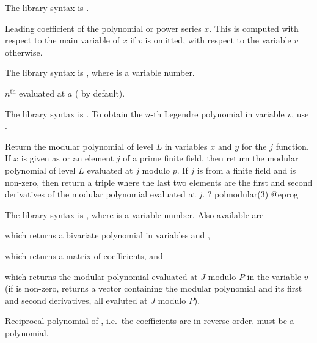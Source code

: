 The library syntax is .

\label{se:pollead}
Leading coefficient of the polynomial or power series $x$. This is
 computed with respect to the main variable of $x$ if $v$ is omitted, with
 respect to the variable $v$ otherwise.

The library syntax is , where  is a variable number.

\label{se:pollegendre}
$n^{\text{th}}$  evaluated at $a$ ( by
default).

The library syntax is .
To obtain the $n$-th Legendre polynomial in variable $v$,
use .

\label{se:polmodular}
Return the modular polynomial of level $L$ in variables $x$ and $y$ for the
$j$ function.  If $x$ is given as  or an element $j$ of a prime
finite field, then return the modular polynomial of level $L$ evaluated at $j$
modulo $p$.  If $j$ is from a finite field and  is
non-zero, then return a triple where the last two elements are the first and
second derivatives of the modular polynomial evaluated at $j$.
\bprog
? polmodular(3)
@eprog

The library syntax is , where  is a variable number.
Also available are

 which returns a
bivariate polynomial in variables  and ,

 which returns a matrix of coefficients, and

 which returns the modular polynomial evaluated at $J$ modulo
$P$ in the variable $v$ (if  is non-zero, returns a
vector containing the modular polynomial and its first and second
derivatives, all evaluted at $J$ modulo $P$).

\label{se:polrecip}
Reciprocal polynomial of , i.e.~the coefficients are in
reverse order.  must be a polynomial.

